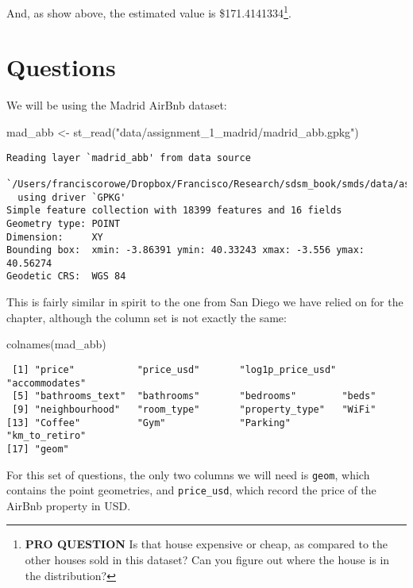 \documentclass[
  letterpaper,
  krantz2]{style/krantz}
\newenvironment{Shaded}{\begin{snugshade}}{\end{snugshade}}
\newcommand{\FunctionTok}[1]{\textcolor[rgb]{0.28,0.35,0.67}{#1}}
\newcommand{\NormalTok}[1]{\textcolor[rgb]{0.00,0.23,0.31}{#1}}
\newcommand{\OtherTok}[1]{\textcolor[rgb]{0.00,0.23,0.31}{#1}}
\newcommand{\StringTok}[1]{\textcolor[rgb]{0.13,0.47,0.30}{#1}}
\begin{document}
And, as show above, the estimated value is \$171.4141334\footnote{\textbf{PRO
  QUESTION} Is that house expensive or cheap, as compared to the other
  houses sold in this dataset? Can you figure out where the house is in
  the distribution?}.

\hypertarget{questions}{%
\section{Questions}\label{questions}}

We will be using the Madrid AirBnb dataset:

\begin{Shaded}
\begin{Highlighting}[]
\NormalTok{mad\_abb }\OtherTok{\textless{}{-}} \FunctionTok{st\_read}\NormalTok{(}\StringTok{"data/assignment\_1\_madrid/madrid\_abb.gpkg"}\NormalTok{)}
\end{Highlighting}
\end{Shaded}

\begin{verbatim}
Reading layer `madrid_abb' from data source 
  `/Users/franciscorowe/Dropbox/Francisco/Research/sdsm_book/smds/data/assignment_1_madrid/madrid_abb.gpkg' 
  using driver `GPKG'
Simple feature collection with 18399 features and 16 fields
Geometry type: POINT
Dimension:     XY
Bounding box:  xmin: -3.86391 ymin: 40.33243 xmax: -3.556 ymax: 40.56274
Geodetic CRS:  WGS 84
\end{verbatim}

This is fairly similar in spirit to the one from San Diego we have
relied on for the chapter, although the column set is not exactly the
same:

\begin{Shaded}
\begin{Highlighting}[]
\FunctionTok{colnames}\NormalTok{(mad\_abb)}
\end{Highlighting}
\end{Shaded}

\begin{verbatim}
 [1] "price"           "price_usd"       "log1p_price_usd" "accommodates"   
 [5] "bathrooms_text"  "bathrooms"       "bedrooms"        "beds"           
 [9] "neighbourhood"   "room_type"       "property_type"   "WiFi"           
[13] "Coffee"          "Gym"             "Parking"         "km_to_retiro"   
[17] "geom"           
\end{verbatim}

For this set of questions, the only two columns we will need is
\texttt{geom}, which contains the point geometries, and
\texttt{price\_usd}, which record the price of the AirBnb property in
USD.
\end{document}
